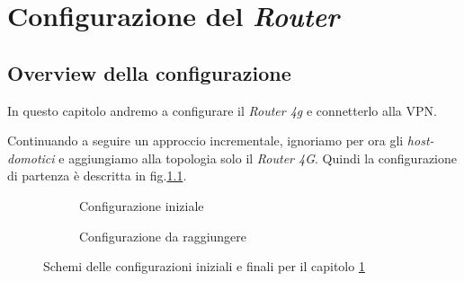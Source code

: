 
\chapter{Configurazione del \textit{Router}}
\label{ch:configurazione-router}

\section{Overview della configurazione}

In questo capitolo andremo a configurare il \textit{Router 4g} e connetterlo alla VPN.

Continuando a seguire un approccio incrementale, ignoriamo per ora gli \textit{host-domotici} e aggiungiamo alla topologia solo il \textit{Router 4G}. Quindi la configurazione di partenza è descritta in fig.\ref{fig:conf-init-router}.

\newsavebox{\myimagea}
\begin{figure}[H]
    \centering%
    \begin{subfigure}{0.4\textwidth}
        \centering
        \usebox{\myimagea}
        \caption{Configurazione iniziale}
        \label{fig:conf-init-router}
    \end{subfigure}
    \hfill%
    \begin{subfigure}{0.5\textwidth}
        \centering
        \caption{Configurazione da raggiungere}
        \label{fig:conf-final-router}
    \end{subfigure}
    \caption{Schemi delle configurazioni iniziali e finali per il capitolo \ref{ch:configurazione-router}}
\end{figure}

